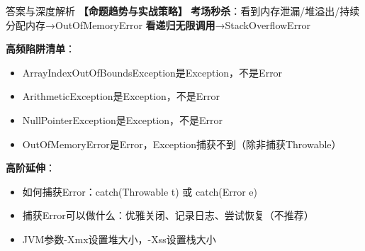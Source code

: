 \documentclass[12pt, a4paper]{ctexart}
\begin{document}
\begin{enumerate}[label=\textbf{\arabic*.}]
\begin{bluebox}{答案与深度解析}
		      \textbf{【命题趋势与实战策略】}
		      \textbf{考场秒杀}：看到内存泄漏/堆溢出/持续分配内存→OutOfMemoryError
		      \textbf{看递归无限调用}→StackOverflowError

		      \textbf{高频陷阱清单}：
		      \begin{itemize}[label={}, nosep]
			      \item ArrayIndexOutOfBoundsException是Exception，不是Error
			      \item ArithmeticException是Exception，不是Error
			      \item NullPointerException是Exception，不是Error
			      \item OutOfMemoryError是Error，Exception捕获不到（除非捕获Throwable）
		      \end{itemize}

		      \textbf{高阶延伸}：
		      \begin{itemize}[label={}, nosep]
			      \item 如何捕获Error：catch(Throwable t) 或 catch(Error e)
			      \item 捕获Error可以做什么：优雅关闭、记录日志、尝试恢复（不推荐）
			      \item JVM参数-Xmx设置堆大小，-Xss设置栈大小
		      \end{itemize}
	      \end{bluebox}

\end{enumerate}
\end{document}
